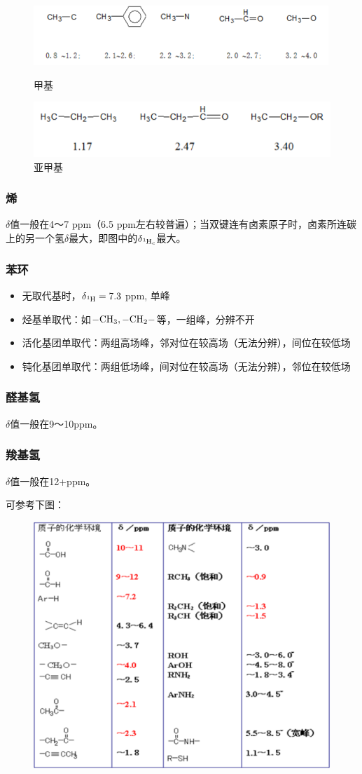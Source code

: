 \begin{figure}
	\centering
	\includegraphics[width=0.7\linewidth]{image/chp6_delta1}
	\caption{甲基}
	\label{fig:chp6delta1}
	\includegraphics[width=0.7\linewidth]{image/chp6_delta2}
	\caption{亚甲基}
	\label{fig:chp6delta2}
\end{figure}

\subsubsection{烯}
$\delta$值一般在4～7 ppm（6.5 ppm左右较普遍）；当双键连有卤素原子时，卤素所连碳上的另一个氢$\delta$最大，即图中的$\delta_{\ce{^{1}H_c}}$最大。

\subsubsection{苯环}
\begin{itemize}
	\item 无取代基时，$\delta_{\ce{^{1}H}}=7.3$ ppm, 单峰
	\item 烃基单取代：如$\ce{-CH3},\ce{-CH2-}$等，一组峰，分辨不开
	\item 活化基团单取代：两组高场峰，邻对位在较高场（无法分辨），间位在较低场
	\item 钝化基团单取代：两组低场峰，间对位在较高场（无法分辨），邻位在较低场
\end{itemize}

\subsubsection{醛基氢}
$\delta$值一般在9～10ppm。

\subsubsection{羧基氢}
$\delta$值一般在12+ppm。

可参考下图：
\begin{figure}[!h]
	\centering
	\includegraphics[width=0.6\linewidth]{image/chp6_1HNMR}
	\label{fig:chp61hnmr}
\end{figure}


